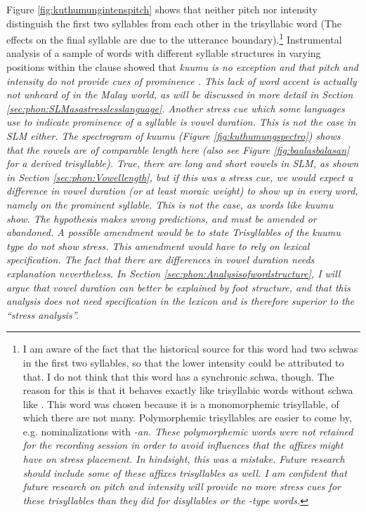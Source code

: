 Figure \ref{fig:kuthumungintenspitch} shows that neither pitch nor intensity distinguish the first two syllables from each other in the trisyllabic word (The effects on the final syllable are due to the utterance boundary).\footnote{I am aware of the fact that the historical source for this word had two schwas in the first two syllables, so that the lower intensity could be attributed to that.  I do not think that this word has a synchronic schwa, though. The reason for this is that it behaves exactly like trisyllabic words without schwa like . This word was chosen because it is a monomorphemic trisyllable, of which there are not many. Polymorphemic trisyllables are easier to come by, e.g. nominalizations with \em -an\em. These polymorphemic words were not retained for the recording session  in order to avoid influences that the affixes might have on stress placement. In hindsight, this was a mistake. Future research should include some of these affixes trisyllables as well. I am confident that future research on pitch and intensity will provide no more stress cues for these trisyllables than they did for disyllables or the -type words.} Instrumental analysis of a sample of words with different syllable structures in varying positions within the clause showed that \em ku\dentt umu\ng{} \em is no exception and that pitch and intensity do not provide cues of prominence \citep{ApoussidouEtAl2008}. This lack of word accent is actually not unheard of in the Malay world, as will be discussed in more detail in Section \ref{sec:phon:SLMasastresslesslanguage}.
Another stress cue which some languages use to indicate prominence of a syllable is vowel duration. This is not the case in SLM either. The spectrogram of \em ku\dentt umu\ng{} \em (Figure \ref{fig:kuthumungspectro}) shows that the vowels are of comparable length here (also see Figure \ref{fig:baalasbalasan} for a derived trisyllable). True, there are long and short vowels in SLM, as shown in Section \ref{sec:phon:Vowellength}, but if this was a stress cue, we would expect a difference in vowel duration (or at least moraic weight) to show up in every word, namely on the prominent syllable. This is not the case, as words like \em ku\dentt umu\ng{} \em show. The hypothesis makes wrong predictions, and must be amended or abandoned. A possible amendment would be to state \em Trisyllables of the \em ku\dentt umu\ng{} \em type do not show stress. \em This amendment would have to rely on lexical specification. The fact that there are differences in vowel duration needs explanation nevertheless. In Section \ref{sec:phon:Analysisofwordstructure}, I will argue that vowel duration can better be explained by foot structure, and that this analysis does not need specification in the lexicon and is therefore superior to the ``stress analysis''.


